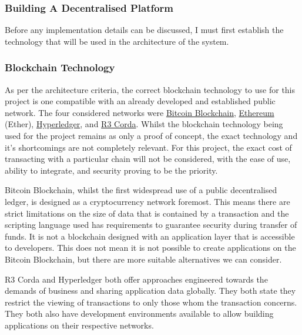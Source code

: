 \subsubsection{Building A Decentralised Platform}

Before any implementation details can be discussed, I must first establish the technology that will be used in the architecture of the system.

\subsubsection{Blockchain Technology}

As per the architecture criteria, the correct blockchain technology to use for this project is one compatible with an already developed and established public network. The four considered networks were \href{https://bitcoin.org/en/}{Bitcoin Blockchain}, \href{https://www.ethereum.org/}{Ethereum} (Ether), \href{https://www.hyperledger.org/}{Hyperledger}, and \href{https://www.corda.net/}{R3 Corda}. Whilst the blockchain technology being used for the project remains as only a proof of concept, the exact technology and it's shortcomings are not completely relevant. For this project, the exact cost of transacting with a particular chain will not be considered, with the ease of use, ability to integrate, and security proving to be the priority.

Bitcoin Blockchain, whilst the first widespread use of a public decentralised ledger, is designed as a cryptocurrency network foremost. This means there are strict limitations on the size of data that is contained by a transaction and the scripting language used has requirements to guarantee security during transfer of funds. It is not a blockchain designed with an application layer that is accessible to developers. This does not mean it is not possible to create applications on the Bitcoin Blockchain, but there are more suitable alternatives we can consider.

R3 Corda and Hyperledger both offer approaches engineered towards the demands of business and sharing application data globally. They both state they restrict the viewing of transactions to only those whom the transaction concerns. They both also have development environments available to allow building applications on their respective networks. 

